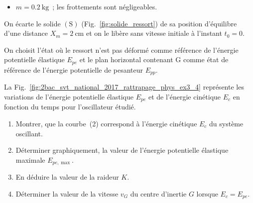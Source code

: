 \begin{donnees}
    \begin{itemize}
        \item $m=\qty{0,2}{\kg}$~; les frottements sont négligeables.
    \end{itemize}
\end{donnees}
On écarte le solide $\mathrm{(S)}$ (Fig.~\ref{fig:solide_ressort}) de sa
position d'équilibre d'une distance $X_{m}=\qty{2}{\cm}$ et on le libère sans
vitesse initiale à l'instant $t_{0}=0$.

On choisit l'état où le ressort n'est pas déformé comme référence de l'énergie
potentielle élastique $E_{pe}$ et le plan horizontal contenant
G comme état de référence de l'énergie potentielle de pesanteur
$E_{pp}$.

\begin{minipage}{0.59\linewidth}
    La Fig.~\ref{fig:2bac_svt_national_2017_rattrapage_phys_ex3_4} représente
    les variations de l'énergie potentielle élastique $E_{pe}$ et de l'énergie
    cinétique $E_{c}$ en fonction du temps pour l'oscillateur étudié.
    \begin{enumerate}
        \item Montrer, que la courbe~(2) correspond à l'énergie cinétique
              $E_{c}$ du système oscillant.
        \item Déterminer graphiquement, la valeur de l'énergie potentielle
              élastique maximale $E_{pe,\max}$.
        \item En déduire la valeur de la raideur $K$.
        \item Déterminer la valeur de la vitesse $v_{G}$ du centre d'inertie $G$
              lorsque $E_{c}=E_{pe}$.
    \end{enumerate}
\end{minipage}
